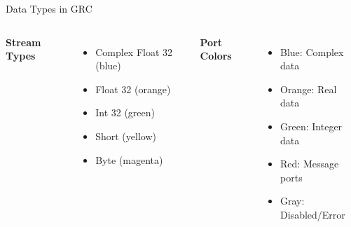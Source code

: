 \documentclass[aspectratio=169,11pt]{beamer}
\begin{document}
\begin{frame}{Data Types in GRC}
\begin{columns}
\textbf{Stream Types}
\begin{itemize}
    \item Complex Float 32 (blue)
    \item Float 32 (orange)
    \item Int 32 (green)
    \item Short (yellow)
    \item Byte (magenta)
\end{itemize}

\textbf{Port Colors}
\begin{itemize}
    \item Blue: Complex data
    \item Orange: Real data
    \item Green: Integer data
    \item Red: Message ports
    \item Gray: Disabled/Error
\end{itemize}
\end{columns}
\end{frame}
\end{document}
